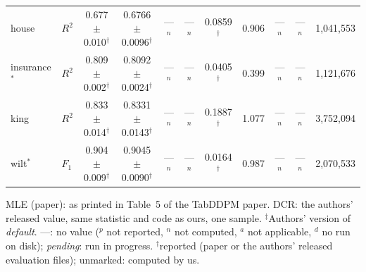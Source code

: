 \begin{table}[t]
{\begin{tabular}{llccccccccc}
house & $R^2$ & 0.677{\scriptsize$\pm$0.010}$^\dagger$ & 0.6766{\scriptsize$\pm$0.0096}$^\dagger$ & ---$^{n}$ & ---$^{n}$ & 0.0859$^\dagger$ & 0.906 & ---$^{n}$ & ---$^{n}$ & 1{,}041{,}553 \\
insurance$^{*}$ & $R^2$ & 0.809{\scriptsize$\pm$0.002}$^\dagger$ & 0.8092{\scriptsize$\pm$0.0024}$^\dagger$ & ---$^{n}$ & ---$^{n}$ & 0.0405$^\dagger$ & 0.399 & ---$^{n}$ & ---$^{n}$ & 1{,}121{,}676 \\
king & $R^2$ & 0.833{\scriptsize$\pm$0.014}$^\dagger$ & 0.8331{\scriptsize$\pm$0.0143}$^\dagger$ & ---$^{n}$ & ---$^{n}$ & 0.1887$^\dagger$ & 1.077 & ---$^{n}$ & ---$^{n}$ & 3{,}752{,}094 \\
wilt$^{*}$ & $F_1$ & 0.904{\scriptsize$\pm$0.009}$^\dagger$ & 0.9045{\scriptsize$\pm$0.0090}$^\dagger$ & ---$^{n}$ & ---$^{n}$ & 0.0164$^\dagger$ & 0.987 & ---$^{n}$ & ---$^{n}$ & 2{,}070{,}533 \\
\bottomrule
\end{tabular}}
\par\smallskip\footnotesize MLE (paper): as printed in Table~5 of the TabDDPM paper. DCR: the authors' released value, same statistic and code as ours, one sample. $^\ddagger$Authors' version of \textit{default}. ---: no value ($^{p}$ not reported, $^{n}$ not computed, $^{a}$ not applicable, $^{d}$ no run on disk); \emph{pending}: run in progress. $^\dagger$reported (paper or the authors' released evaluation files); unmarked: computed by us.
\end{table}
